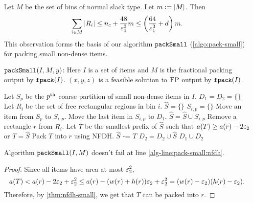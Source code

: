 Let $M$ be the set of bins of normal slack type. Let $m := |M|$. Then
\[ \sum_{i \in M} |R_i| \le n_c + \frac{48}{\varepsilon_1^3} m
\le \left(\frac{64}{\varepsilon_1^3} + d\right) m. \]
This observation forms the basis of our algorithm $\operatorname{\mathtt{packSmall}}$ (\cref{algo:pack-small})
for packing small non-dense items.

\begin{algorithm}[htb]
\caption{$\operatorname{\mathtt{packSmall}}(I, M, y)$:
Here $I$ is a set of items and $M$ is the fractional packing output by $\operatorname{\mathtt{fpack}}(I)$.
$(x, y, z)$ is a feasible solution to $\operatorname{FP}$ output by $\operatorname{\mathtt{fpack}}(I)$.}
\label{algo:pack-small}
\begin{algorithmic}[1]
\State Let $S_p$ be the $p^{\textrm{th}}$ coarse partition of small non-dense items in $I$.
\State $D_1 = D_2 = \{\}$  
    \State Let $R_i$ be the set of free rectangular regions in bin $i$.
    \State $\widehat{S} = \{\}$
        \State $S_{i,p} = \{\}$
            \State Move an item from $S_p$ to $S_{i,p}$.
        \EndWhile
         \label{alg-line:pack-small:select}
            \State Move the last item in $S_{i,p}$ to $D_1$.
        \EndIf
        \State $\widehat{S} = \widehat{S} \cup S_{i,p}$
    \EndFor
        \State Remove a rectangle $r$ from $R_i$.
        \State Let $T$ be the smallest prefix of $\widehat{S}$ such that
            $a(T) \ge a(r) - 2\varepsilon_2$ or $T = \widehat{S}$
        \State \label{alg-line:pack-small:nfdh}Pack $T$ into $r$ using NFDH.
        \State $\widehat{S} \texttt{ -= } T$
    \EndWhile
    \State $D_2 = D_2 \cup \widehat{S}$
\EndFor
\State \Return $D_1 \cup D_2$  
\end{algorithmic}
\end{algorithm}

\begin{lemma}
Algorithm $\operatorname{\mathtt{packSmall}}(I, M)$ doesn't fail at line \ref{alg-line:pack-small:nfdh}.
\end{lemma}
\begin{proof}
Since all items have area at most $\varepsilon_2^2$,
\[ a(T) < a(r) - 2\varepsilon_2 + \varepsilon_2^2
\le a(r) - (w(r) + h(r))\varepsilon_2 + \varepsilon_2^2
= (w(r) - \varepsilon_2)(h(r) - \varepsilon_2). \]
Therefore, by \cref{thm:nfdh-small}, we get that $T$ can be packed into $r$.
\end{proof}

